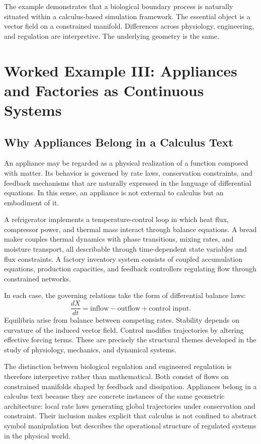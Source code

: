 \documentclass[12pt]{book}
\begin{document}
The example demonstrates that a biological boundary process is
naturally situated within a calculus-based simulation framework.
The essential object is a vector field on a constrained manifold.
Differences across physiology, engineering, and regulation are
interpretive. The underlying geometry is the same.

\chapter{Worked Example III: Appliances and Factories as Continuous Systems}

\section{Why Appliances Belong in a Calculus Text}

An appliance may be regarded as a physical realization of a function
composed with matter. Its behavior is governed by rate laws, conservation
constraints, and feedback mechanisms that are naturally expressed in the
language of differential equations. In this sense, an appliance is not
external to calculus but an embodiment of it.

A refrigerator implements a temperature-control loop in which heat flux,
compressor power, and thermal mass interact through balance equations.
A bread maker couples thermal dynamics with phase transitions, mixing
rates, and moisture transport, all describable through time-dependent
state variables and flux constraints. A factory inventory system consists
of coupled accumulation equations, production capacities, and feedback
controllers regulating flow through constrained networks.

In each case, the governing relations take the form of differential
balance laws:
\[
\frac{dX}{dt} = \text{inflow} - \text{outflow} + \text{control input}.
\]
Equilibria arise from balance between competing rates. Stability depends
on curvature of the induced vector field. Control modifies trajectories
by altering effective forcing terms. These are precisely the structural
themes developed in the study of physiology, mechanics, and dynamical
systems.

The distinction between biological regulation and engineered regulation
is therefore interpretive rather than mathematical. Both consist of flows
on constrained manifolds shaped by feedback and dissipation. Appliances
belong in a calculus text because they are concrete instances of the same
geometric architecture: local rate laws generating global trajectories
under conservation and constraint. Their inclusion makes explicit that
calculus is not confined to abstract symbol manipulation but describes
the operational structure of regulated systems in the physical world.
\end{document}

